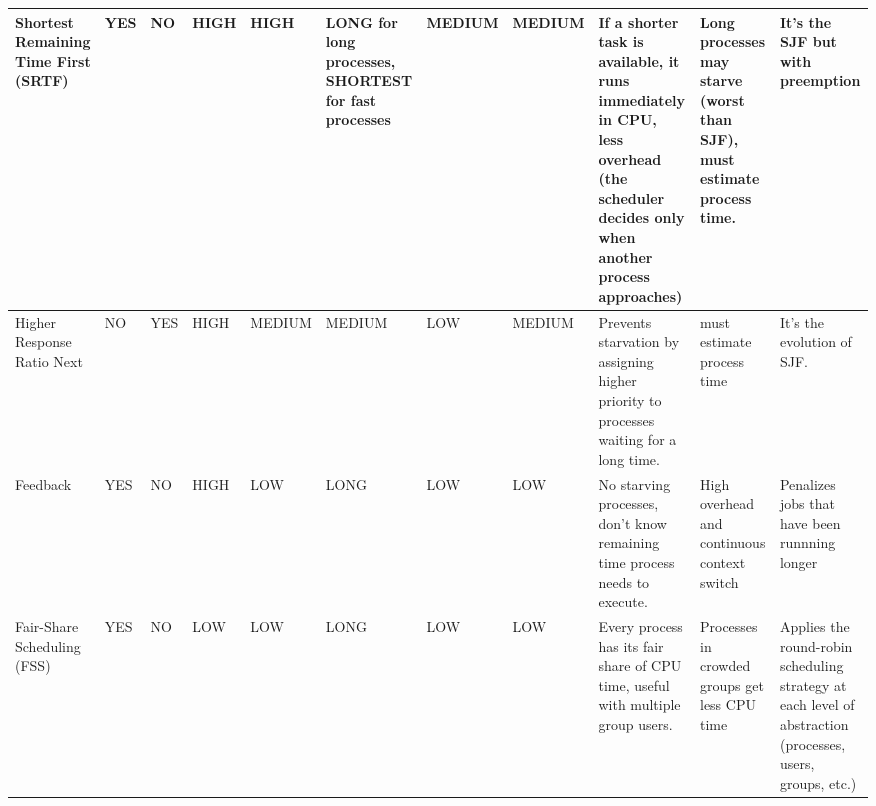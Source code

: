 \begin{table}[]
{\begin{tabular}{|m{}|m{}|m{}|m{}|m{}|m{}|m{}|m{}|m{}|m{}|m{}|}
			Shortest Remaining Time First (SRTF) & YES                 & NO                & HIGH                     & HIGH               & LONG for long processes, SHORTEST for fast processes & MEDIUM                                          & MEDIUM                                          & If a shorter task is available, it runs immediately in CPU, less overhead (the scheduler decides only when another process approaches) & Long processes may starve (worst than SJF), must estimate process time.                                 & It's the SJF but with preemption                                                                                           \\ \hline
			Higher Response Ratio Next           & NO                  & YES               & HIGH                     & MEDIUM             & MEDIUM                                               & LOW                                             & MEDIUM                                          & Prevents starvation by assigning higher priority to processes waiting for a long time.                                                 & must estimate process time                                                                              & It's the evolution of SJF.                                                                                                 \\ \hline
			Feedback                             & YES                 & NO                & HIGH                     & LOW                & LONG                                                 & LOW                                             & LOW                                             & No starving processes, don't know remaining time process needs to execute.                                                             & High overhead and continuous context switch                                                             & Penalizes jobs that have been runnning longer                                                                              \\ \hline
			Fair-Share Scheduling (FSS)          & YES                 & NO                & LOW                      & LOW                & LONG                                                 & LOW                                             & LOW                                             & Every process has its fair share of CPU time, useful with multiple group users.                                                        & Processes in crowded groups get less CPU time                                                           & Applies the round-robin scheduling strategy at each level of abstraction (processes, users, groups, etc.)                  \\ \hline

\end{tabular}}
\end{table}
